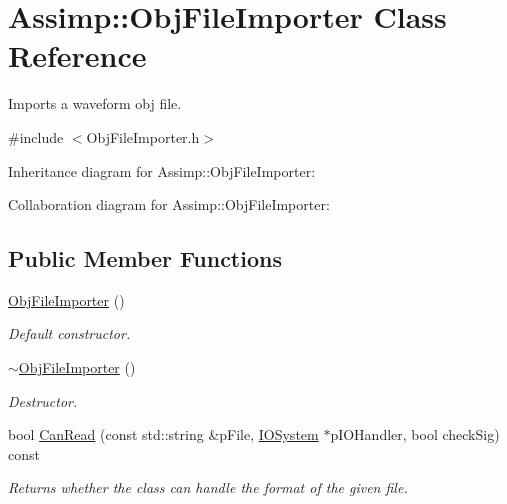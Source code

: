 \hypertarget{class_assimp_1_1_obj_file_importer}{\section{Assimp\+:\+:Obj\+File\+Importer Class Reference}
\label{class_assimp_1_1_obj_file_importer}
}


Imports a waveform obj file.  




{\ttfamily \#include $<$Obj\+File\+Importer.\+h$>$}



Inheritance diagram for Assimp\+:\+:Obj\+File\+Importer\+:


Collaboration diagram for Assimp\+:\+:Obj\+File\+Importer\+:
\subsection*{Public Member Functions}
\begin{DoxyCompactItemize}
\item 
\hypertarget{class_assimp_1_1_obj_file_importer_a99f0782dcf13ea55b0cc98723de23a88}{\hyperlink{class_assimp_1_1_obj_file_importer_a99f0782dcf13ea55b0cc98723de23a88}{Obj\+File\+Importer} ()}\label{class_assimp_1_1_obj_file_importer_a99f0782dcf13ea55b0cc98723de23a88}

\begin{DoxyCompactList}\small\item\em Default constructor. \end{DoxyCompactList}\item 
\hypertarget{class_assimp_1_1_obj_file_importer_a67ccef4afc0fb7c39d72598c492f75a4}{\hyperlink{class_assimp_1_1_obj_file_importer_a67ccef4afc0fb7c39d72598c492f75a4}{$\sim$\+Obj\+File\+Importer} ()}\label{class_assimp_1_1_obj_file_importer_a67ccef4afc0fb7c39d72598c492f75a4}

\begin{DoxyCompactList}\small\item\em Destructor. \end{DoxyCompactList}\item 
bool \hyperlink{class_assimp_1_1_obj_file_importer_a72c5f978c9c4c618b407e062b9912ed3}{Can\+Read} (const std\+::string \&p\+File, \hyperlink{class_assimp_1_1_i_o_system}{I\+O\+System} $\ast$p\+I\+O\+Handler, bool check\+Sig) const 
\begin{DoxyCompactList}\small\item\em Returns whether the class can handle the format of the given file. \end{DoxyCompactList}\end{DoxyCompactItemize}
